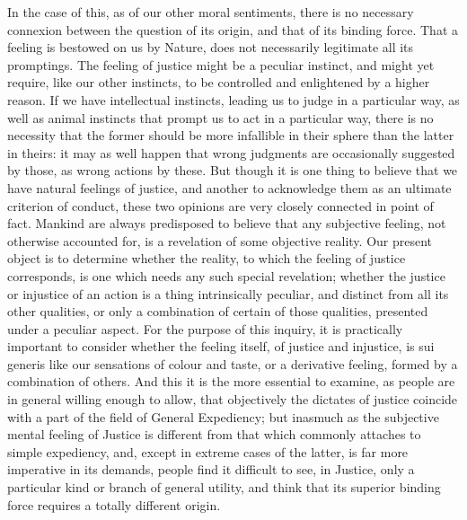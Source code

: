 \documentclass[12pt]{report}
\begin{document}
In the case of this, as of our other moral sentiments, there is no necessary connexion between the question of its origin, and that of its binding force. That a feeling is bestowed on us by Nature, does not necessarily legitimate all its promptings. The feeling of justice might be a peculiar instinct, and might yet require, like our other instincts, to be controlled and enlightened by a higher reason. If we have intellectual instincts, leading us to judge in a particular way, as well as animal instincts that prompt us to act in a particular way, there is no necessity that the former should be more infallible in their sphere than the latter in theirs: it may as well happen that wrong judgments are occasionally suggested by those, as wrong actions by these. But though it is one thing to believe that we have natural feelings of justice, and another to acknowledge them as an ultimate criterion of conduct, these two opinions are very closely connected in point of fact. Mankind are always predisposed to believe that any subjective feeling, not otherwise accounted for, is a revelation of some objective reality. Our present object is to determine whether the reality, to which the feeling of justice corresponds, is one which needs any such special revelation; whether the justice or injustice of an action is a thing intrinsically peculiar, and distinct from all its other qualities, or only a combination of certain of those qualities, presented under a peculiar aspect. For the purpose of this inquiry, it is practically important to consider whether the feeling itself, of justice and injustice, is sui generis like our sensations of colour and taste, or a derivative feeling, formed by a combination of others. And this it is the more essential to examine, as people are in general willing enough to allow, that objectively the dictates of justice coincide with a part of the field of General Expediency; but inasmuch as the subjective mental feeling of Justice is different from that which commonly attaches to simple expediency, and, except in extreme cases of the latter, is far more imperative in its demands, people find it difficult to see, in Justice, only a particular kind or branch of general utility, and think that its superior binding force requires a totally different origin.
\end{document}
